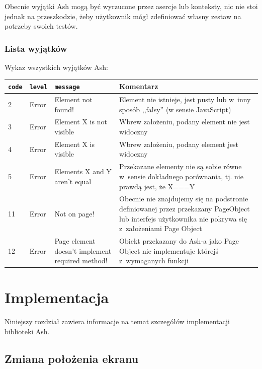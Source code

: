 \documentclass[brudnopis]{xmgr}
\begin{document}
Obecnie wyjątki Ash mogą być wyrzucone przez asercje lub konteksty, nic nie stoi jednak na przeszkodzie, żeby użytkownik mógł zdefiniować własny zestaw na potrzeby swoich testów.  

\subsection{Lista wyjątków}

Wykaz wszystkich wyjątków Ash:
\begin{center}
    \begin{tabularx}{\textwidth}{ | p{1cm} | p{2cm} | X | X |}
    \hline
    \texttt{code} & \texttt{level} & \texttt{message} & Komentarz \\ \hline
    2 & Error & Element not found! & Element nie istnieje, jest pusty lub w~inny sposób ,,falsy'' (w sensie JavaScript)  \\ \hline
    3 & Error & Element X is not visible & Wbrew założeniu, podany element nie jest widoczny  \\ \hline
    4 & Error & Element X is visible & Wbrew założeniu, podany element jest widoczny  \\ \hline
    5 & Error & Elements X and Y aren't equal & Przekazane elementy nie są sobie równe w~sensie dokładnego porównania, tj.  nie prawdą jest, że X===Y  \\ \hline
    11 & Error & Not on page! & Obecnie nie znajdujemy się na podstronie definiowanej przez przekazany PageObject lub interfejs użytkownika nie pokrywa się z~założeniami Page Object  \\ \hline
    12 & Error & Page element doesn't implement required method! & Obiekt przekazany do Ash-a jako Page Object nie implementuje którejś z~wymaganych funkcji  \\ \hline
    \end{tabularx}
\end{center}

\chapter{Implementacja}

Niniejszy rozdział zawiera informacje na temat szczegółów implementacji biblioteki Ash.

\section{Zmiana położenia ekranu}
\end{document}
